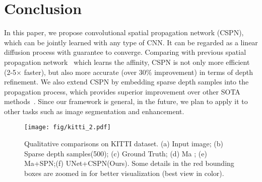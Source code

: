 \section{Conclusion}
In this paper, we propose convolutional spatial propagation network (CSPN), which can be jointly learned with any type of CNN.  It can be regarded as a linear diffusion process with guarantee to converge. Comparing with previous spatial propagation network~\cite{liu2017learning} which learns the affinity, CSPN is not only more efficient (2-5$\times$ faster), but also more accurate (over $30\%$ improvement) in terms of depth refinement. We also extend CSPN by embedding sparse depth samples into the propagation process, which provides superior improvement over other SOTA methods~\cite{Ma2017SparseToDense}. Since our framework is general, in the future, we plan to apply it to other tasks such as image segmentation and enhancement.

\begin{figure}[!htpb]
\centering
\texttt{[image: fig/kitti\_2.pdf]}
\caption{Qualitative comparisons on KITTI dataset. (a) Input image; (b) Sparse depth samples(500); (c) Ground Truth; (d) Ma \etal \cite{Ma2017SparseToDense}; (e) Ma\cite{Ma2017SparseToDense}+SPN\cite{liu2016learning};(f) UNet+CSPN(Ours). Some details in the red bounding boxes are zoomed in for better visualization (best view in color).}
\label{fig:kitti}
\end{figure}